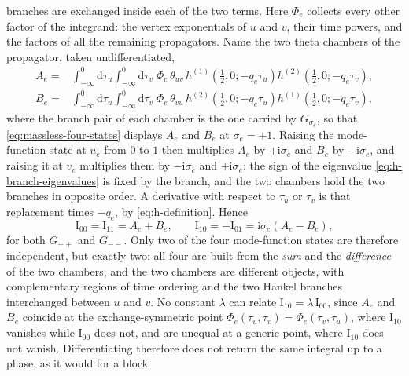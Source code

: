 \documentclass[11pt,a4paper]{article}
\newcommand{\dd}{\mathrm d}
\newcommand{\ii}{\mathrm i}
\begin{document}
branches are exchanged inside each of the two terms. Here $\Phi_e$ collects every other factor of
the integrand: the vertex exponentials of $u$ and $v$, their time powers, and the factors of all the
remaining propagators. Name the two theta chambers of the propagator, taken undifferentiated,
\begin{equation}
  \begin{aligned}
  A_e={}&\int_{-\infty}^{0}\!\!\dd\tau_u\!\int_{-\infty}^{0}\!\!\dd\tau_v\;\Phi_e\,\theta_{uv}\,
  h^{(1)}\!\left(\tfrac12,0;-q_e\tau_u\right)h^{(2)}\!\left(\tfrac12,0;-q_e\tau_v\right),\\
  B_e={}&\int_{-\infty}^{0}\!\!\dd\tau_u\!\int_{-\infty}^{0}\!\!\dd\tau_v\;\Phi_e\,\theta_{vu}\,
  h^{(2)}\!\left(\tfrac12,0;-q_e\tau_u\right)h^{(1)}\!\left(\tfrac12,0;-q_e\tau_v\right),
  \end{aligned}
  \label{eq:chamber-integrals}
\end{equation}
where the branch pair of each chamber is the one carried by $G_{\sigma_e}$, so that
\eqref{eq:massless-four-states} displays $A_e$ and $B_e$ at $\sigma_e=+1$. Raising the
mode-function state at $u_e$ from $0$ to $1$ then multiplies $A_e$ by $+\ii\sigma_e$ and $B_e$ by
$-\ii\sigma_e$, and raising it at $v_e$ multiplies them by $-\ii\sigma_e$ and $+\ii\sigma_e$: the sign
of the eigenvalue \eqref{eq:h-branch-eigenvalues} is fixed by the branch, and the two chambers hold
the two branches in opposite order. A derivative with respect to $\tau_u$ or $\tau_v$ is that
replacement times $-q_e$, by \eqref{eq:h-definition}. Hence
\begin{equation}
  \text{I}_{00}=\text{I}_{11}=A_e+B_e,
  \qquad
  \text{I}_{10}=-\text{I}_{01}=\ii\sigma_e\left(A_e-B_e\right),
  \label{eq:massless-relations}
\end{equation}
for both $G_{++}$ and $G_{--}$. Only two of the four mode-function states are therefore independent, but exactly
two: all four are built from the \emph{sum} and the \emph{difference} of the two chambers, and the two
chambers are different objects, with complementary regions of time ordering and the two Hankel
branches interchanged between $u$ and $v$. No constant $\lambda$ can relate
$\text{I}_{10}=\lambda\,\text{I}_{00}$, since $A_e$ and $B_e$ coincide at the exchange-symmetric
point $\Phi_e(\tau_u,\tau_v)=\Phi_e(\tau_v,\tau_u)$, where $\text{I}_{10}$ vanishes while
$\text{I}_{00}$ does not, and are unequal at a generic point, where $\text{I}_{10}$ does not vanish.
Differentiating therefore does not return the same integral up to a phase, as it would for a block
\end{document}

